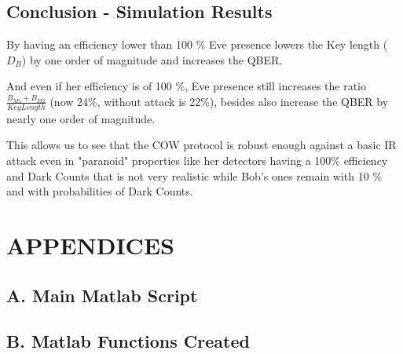 \begin{refsection}
\pagebreak
\subsection{Conclusion - Simulation Results}

By having an efficiency lower than 100 \% Eve presence lowers the Key length ($D_B$) by one order of magnitude and increases the QBER.

And even if her efficiency is of 100 \%, Eve presence still increases the ratio $\frac{B_{M1}+B_{M2}}{Key Length}$ (now 24\%, without attack is 22\%), besides also increase the QBER by nearly one order of magnitude.

This allows us to see that the COW protocol is robust enough against a basic IR attack even in "paranoid" properties like her detectors having a 100\% efficiency and Dark Counts that is not very realistic while Bob's ones remain with 10 \% and with probabilities of Dark Counts.

\section*{APPENDICES}
\subsection{A. Main Matlab Script}



{\scriptsize }

\subsection{B. Matlab Functions Created}

{\scriptsize }

\clearpage
\printbibliography[heading=subbibliography]
\end{refsection}
\cleardoublepage

